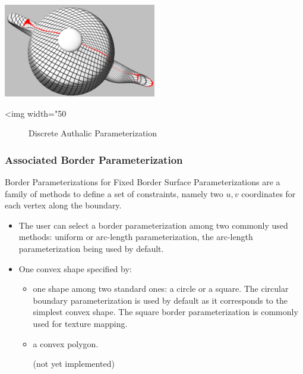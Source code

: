 \begin{center}
    \label{parameterization-fig-authalic}
    \begin{ccTexOnly}
        \includegraphics[width=0.5\textwidth]{Parameterization/authalic} %
    \end{ccTexOnly}
    \begin{ccHtmlOnly}
        <img width="50%
    \end{ccHtmlOnly}
    \begin{figure}[h]
        \caption{Discrete Authalic Parameterization}
    \end{figure}
\end{center}


\subsubsection{Associated Border Parameterization}

Border Parameterizations for Fixed Border Surface Parameterizations
are a family of methods to define a set of constraints, namely two
$u,v$ coordinates for each vertex along the boundary.

\begin{itemize}

\item The user can select a border parameterization among
two commonly used methods: uniform or arc-length parameterization, the
arc-length parameterization being used by default.

\item One convex shape specified by:

    \begin{itemize}

    \item one shape among two standard ones: a circle or a square.
    The circular boundary parameterization is used by default as it
    corresponds to the simplest convex shape. The square border
    parameterization is commonly used for texture mapping.

    \item a convex polygon.

    (not yet implemented)

    \end{itemize}

\end{itemize}

